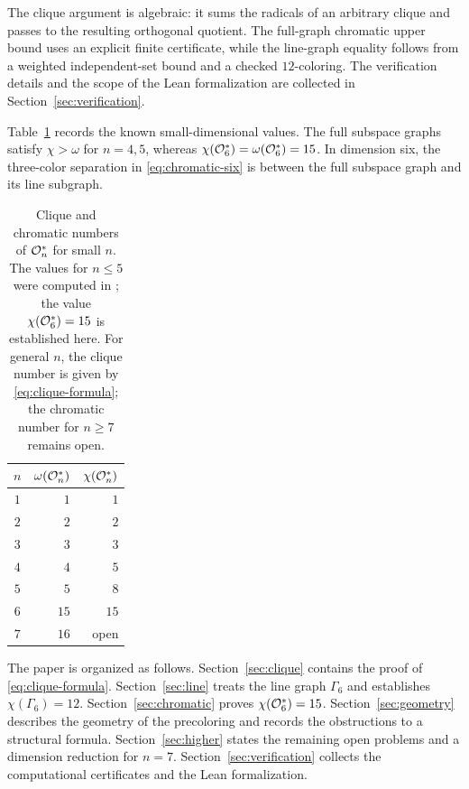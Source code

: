 The clique argument is algebraic: it sums the radicals of an arbitrary
clique and passes to the resulting orthogonal quotient.  The
full-graph chromatic upper bound uses an explicit finite certificate,
while the line-graph equality follows from a weighted independent-set
bound and a checked \(12\)-coloring.  The verification details and the
scope of the Lean formalization are collected in
Section~\ref{sec:verification}.

Table~\ref{tab:small-values} records the known small-dimensional values.
The full subspace graphs satisfy \(\chi>\omega\) for \(n=4,5\), whereas
\(\chi(\mathcal O_6^*)=\omega(\mathcal O_6^*)=15\). In dimension six, the
three-color separation in \eqref{eq:chromatic-six} is between the full
subspace graph and its line subgraph.

\begin{table}[htbp]
\centering
\begin{tabular}{c|r|r}
\toprule
\(n\) & \(\omega(\mathcal O_n^*)\) & \(\chi(\mathcal O_n^*)\) \\
\midrule
\(1\) & \(1\)  & \(1\)  \\
\(2\) & \(2\)  & \(2\)  \\
\(3\) & \(3\)  & \(3\)  \\
\(4\) & \(4\)  & \(5\)  \\
\(5\) & \(5\)  & \(8\)  \\
\(6\) & \(15\) & \(15\) \\
\(7\) & \(16\) & open \\
\bottomrule
\end{tabular}
\caption{Clique and chromatic numbers of \(\mathcal O_n^*\) for small \(n\).
The values for \(n\le5\) were computed in \cite{Nikandish2026}; the
value \(\chi(\mathcal O_6^*)=15\) is established here.  For general \(n\),
the clique number is given by \eqref{eq:clique-formula}; the chromatic
number for \(n\ge7\) remains open.}
\label{tab:small-values}
\end{table}

The paper is organized as follows.  Section~\ref{sec:clique} contains
the proof of \eqref{eq:clique-formula}.
Section~\ref{sec:line} treats the line graph \(\Gamma_6\) and
establishes \(\chi(\Gamma_6)=12\).
Section~\ref{sec:chromatic} proves \(\chi(\mathcal O_6^*)=15\).
Section~\ref{sec:geometry} describes the geometry of the precoloring
and records the obstructions to a structural formula.
Section~\ref{sec:higher} states the remaining open problems and a
dimension reduction for \(n=7\).
Section~\ref{sec:verification} collects the computational
certificates and the Lean formalization.
